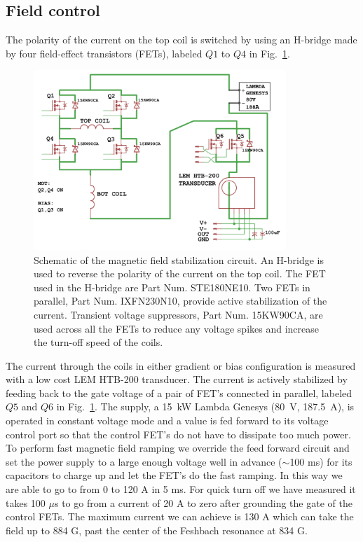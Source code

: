 \documentclass[oneside,12pt]{memoir}
\begin{document}
\subsection{Field control}

The polarity of the current on the top coil is switched by using an H-bridge
made by four field-effect transistors (FETs), labeled $Q1$ to $Q4$ in
Fig.~\ref{fig:fieldcircuit}.  \begin{figure} 
\centering
\includegraphics[width=0.85\textwidth]{../figures/coils/circuit-schematic.pdf}
\caption[Magnetic field control circuit]{\small Schematic of the magnetic field
stabilization circuit.  An H-bridge is used to reverse the polarity of the
current on the top coil.  The FET used in the H-bridge are Part Num. STE180NE10.
Two FETs in parallel, Part Num. IXFN230N10, provide active stabilization of the
current. Transient voltage suppressors, Part Num. 15KW90CA, are used across
all the FETs to reduce any voltage spikes and increase the turn-off speed of
the coils.} \label{fig:fieldcircuit} \end{figure} The current through the coils
in either gradient or bias configuration is measured with a low cost LEM
HTB-200 transducer.  The current is actively stabilized by feeding back to the
gate voltage of a pair of FET's connected in parallel, labeled $Q5$ and $Q6$ in
Fig.~\ref{fig:fieldcircuit}.  The supply, a 15~kW Lambda Genesys (80~V,
187.5~A), is operated in constant voltage mode and a value is fed forward to
its voltage control port so that the control FET's do not have to dissipate too
much power.  To perform fast magnetic field ramping we override the feed
forward circuit and set the power supply to a large enough voltage well in
advance ($\sim$100 ms) for its capacitors to charge up and let the FET's do
the fast ramping.   In this way we are able to go to from 0 to 120 A in 5 ms.
For quick turn off we have
measured it takes 100 $\mu$s to go from a current of 20 A to zero after
grounding the gate of the control FETs.  The maximum current we can achieve is
130 A which can take the field up to 884 G, past the center of the Feshbach
resonance at 834 G.   
\end{document}

